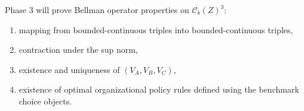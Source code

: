 Phase 3 will prove Bellman operator properties on $\mathcal C_b(Z)^3$:
\begin{enumerate}
    \item mapping from bounded-continuous triples into bounded-continuous triples,
    \item contraction under the sup norm,
    \item existence and uniqueness of $(V_A,V_B,V_C)$,
    \item existence of optimal organizational policy rules defined using the benchmark choice objects.
\end{enumerate}
